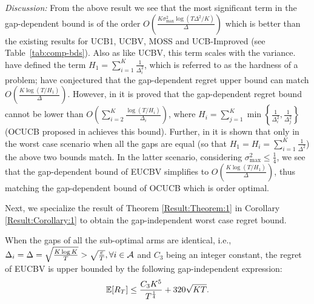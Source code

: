 \emph{Discussion:} From the above result we see that the most significant term in the gap-dependent bound is of the order $O\left(\frac{K\sigma^2_{\max}\log{(T\Delta^{2}/K)}}{\Delta}\right)$ which is better than the existing results for UCB1, UCBV, MOSS and UCB-Improved (see Table~\ref{tab:comp-bds}). Also as like UCBV, this term scales with the variance. \citet{audibert2010best} have defined the term $H_1=\sum_{i=1}^{K}\frac{1}{\Delta_i^2}$, which is referred to as the hardness of a problem; \citet{bubeck2012regret} have conjectured that the gap-dependent regret upper bound can match $O\left(\frac{K\log{(T/H_1)}}{\Delta}\right)$. However, in  \citet{lattimore2015optimally} it is proved that the gap-dependent regret bound cannot be lower than $O\left(\sum_{i=2}^{K}\frac{\log\left(T/H_i\right)}{\Delta_i}\right)$, where $H_i=\sum_{j=1}^{K}\min\left\lbrace \frac{1}{\Delta_i^2},\frac{1}{\Delta_j^2}\right\rbrace$ (OCUCB proposed in \citet{lattimore2015optimally} achieves this bound). Further, in \citet{lattimore2015optimally} it is shown that only in the worst case scenario when all the gaps are equal (so that $H_1=H_{i}=\sum_{i=1}^{K}\frac{1}{\Delta^2}$) the above two bounds match. In the latter scenario, considering $\sigma^2_{\max}\leq \frac{1}{4}$, we see that the gap-dependent bound of EUCBV simplifies to $O\left(\frac{K\log{(T/H_1)}}{\Delta}\right)$, thus matching the gap-dependent bound of OCUCB which is order optimal.

Next, we specialize the result of Theorem \ref{Result:Theorem:1} in Corollary \ref{Result:Corollary:1} to  obtain the gap-independent worst case regret bound. %



\begin{corollary}
\label{Result:Corollary:1}
When the gaps of all the sub-optimal arms are identical, i.e., $\Delta_i =\Delta = \sqrt{\frac{K\log K}{T}}>\sqrt{\frac{e}{T}}, \forall i\in \mathcal{A}$ and $C_3$ being an integer constant, the
regret of EUCBV is upper bounded by the following gap-independent expression:
\begin{align*}
	\mathbb{E}[R_{T}]\leq  \dfrac{C_3 K^5}{T^{\frac{1}{4}}} + 320\sqrt{KT}.
\end{align*}	
\end{corollary}
	
